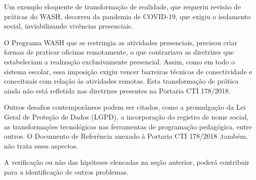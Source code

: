 \documentclass[
12pt,		%
openright,	%
twoside,  %
a4paper,			%
chapter=TITLE,		%
english,			%
french,				%
spanish,			%
brazil				%
]{USPSC-classe/USPSC}
\begin{document}
Um exemplo eloquente de transforma\c{c}\~ao de realidade, que requeriu revis\~ao de pr\'aticas do WASH, decorreu da pandemia de COVID-19, que exigiu o isolamento social, inviabilizando viv\^encias presenciais.

















O Programa WASH que se restringia as atividades presenciais, precisou criar formas de praticar oficinas remotamente, o que contrariava as diretrizes que estabeleciam a realiza\c{c}\~ao exclusivamente presencial. Assim, como em todo o sistema escolar, essa imposi\c{c}\~ao exigiu vencer barreiras t\'ecnicas de conectividade e conceituais com rela\c{c}\~ao \`as atividades remotas. Esta transforma\c{c}\~ao de pr\'atica ainda n\~ao est\'a refletida nas diretrizes presentes na Portaria CTI 178/2018.

















Outros desafios contempor\^aneos podem ser citados, como a promulga\c{c}\~ao da Lei Geral de Prote\c{c}\~ao de Dados (LGPD), a incorpora\c{c}\~ao do registro de nome social, as transforma\c{c}\~oes tecnol\'ogicas nas ferramentas de programa\c{c}\~ao pedag\'ogica, entre outros. O Documento de Refer\^encia anexado \`a Portaria CTI 178/2018 ,tamb\'em, n\~ao trata esses aspectos.

















A verifica\c{c}\~ao ou n\~ao das hip\'oteses elencadas na se\c{c}\~ao anterior, poder\'a contribuir para a identifica\c{c}\~ao de outros problemas.
\end{document}
